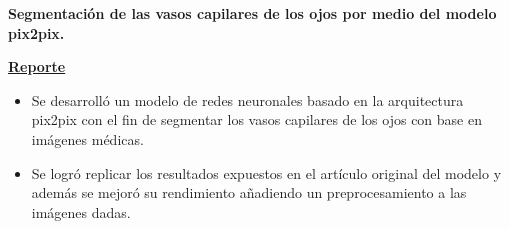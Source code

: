 \documentclass[a3paper]{adcv_color}
\newcommand{\proyect}[5]{\begin{minipage}{1\linewidth}
		\begin{minipage}{1\linewidth}
			\textbf{#1}
		\end{minipage}
	\end{minipage}
	\href{#4}{\textbf{#5}}
	\vspace{-1cm}\\
}
\begin{document}
\proyect{Segmentación de las vasos capilares de los ojos por medio del modelo pix2pix.}{Agosto 2022}{-0.6}{https://raw.githubusercontent.com/giovannilopez9808/RetinaVesselNet/main/Document/Main.pdf}{Reporte}
\begin{itemize}
	\setlength\itemsep{0em}
	\item Se desarrolló un modelo de redes neuronales basado en la arquitectura pix2pix con el fin de segmentar los vasos capilares de los ojos con base en imágenes médicas.
	\item Se logró replicar los resultados expuestos en el artículo original del modelo y además se mejoró su rendimiento añadiendo un preprocesamiento a las imágenes dadas.
\end{itemize}






\end{document}
